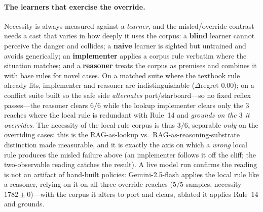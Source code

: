 \documentclass{article}
\begin{document}
\paragraph{The learners that exercise the override.} Necessity is always measured against a
\emph{learner}, and the misled/override contrast needs a cast that varies in how deeply it uses the
corpus: a \textbf{blind} learner cannot perceive the danger and collides; a \textbf{naive} learner is
sighted but untrained and avoids generically; an \textbf{implementer} applies a corpus rule verbatim
where the situation matches; and a \textbf{reasoner} treats the corpus as premises and combines it with
base rules for novel cases. On a matched suite where the textbook rule already fits, implementer and
reasoner are indistinguishable ($\Delta$regret $0.00$); on a conflict suite built so the safe side
\emph{alternates} port/starboard---so no fixed reflex passes---the reasoner clears $6/6$ while the
lookup implementer clears only the $3$ reaches where the local rule is redundant with Rule~14 and
\emph{grounds on the $3$ it overrides}. The necessity of the local-rule corpus is thus $3/6$, separable
\emph{only} on the overriding cases: this is the RAG-as-lookup vs.\ RAG-as-reasoning-substrate
distinction made measurable, and it is exactly the axis on which a \emph{wrong} local rule produces the
misled failure above (an implementer follows it off the cliff; the two-observable reading catches the
result). A live model run confirms the reading is not an artifact of hand-built policies:
Gemini-2.5-flash applies the local rule like a reasoner, relying on it on all three override reaches
($5/5$ samples, necessity $1782\pm0$)---with the corpus it alters to port and clears, ablated it applies
Rule~14 and grounds.
\end{document}
